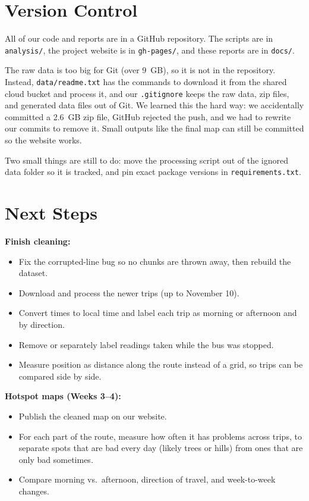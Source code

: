 \documentclass{article}
\begin{document}
\section{Version Control}

All of our code and reports are in a GitHub repository. The scripts are in \texttt{analysis/}, the project website is in \texttt{gh-pages/}, and these reports are in \texttt{docs/}.

The raw data is too big for Git (over 9~GB), so it is not in the repository. Instead, \texttt{data/readme.txt} has the commands to download it from the shared cloud bucket and process it, and our \texttt{.gitignore} keeps the raw data, zip files, and generated data files out of Git. We learned this the hard way: we accidentally committed a 2.6~GB zip file, GitHub rejected the push, and we had to rewrite our commits to remove it. Small outputs like the final map can still be committed so the website works.

Two small things are still to do: move the processing script out of the ignored data folder so it is tracked, and pin exact package versions in \texttt{requirements.txt}.

\section{Next Steps}
\label{sec:next}

\textbf{Finish cleaning:}
\begin{itemize}
    \item Fix the corrupted-line bug so no chunks are thrown away, then rebuild the dataset.
    \item Download and process the newer trips (up to November 10).
    \item Convert times to local time and label each trip as morning or afternoon and by direction.
    \item Remove or separately label readings taken while the bus was stopped.
    \item Measure position as distance along the route instead of a grid, so trips can be compared side by side.
\end{itemize}

\textbf{Hotspot maps (Weeks 3--4):}
\begin{itemize}
    \item Publish the cleaned map on our website.
    \item For each part of the route, measure how often it has problems across trips, to separate spots that are bad every day (likely trees or hills) from ones that are only bad sometimes.
    \item Compare morning vs.\ afternoon, direction of travel, and week-to-week changes.
\end{itemize}
\end{document}
